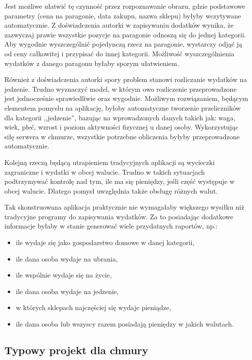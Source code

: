 \documentclass[12pt,a4paper,twoside,titlepage,openright]{book}
\begin{document}
Jest możliwe ułatwić tę czynność przez rozpoznawanie obrazu, gdzie podstawowe parametry (cena na paragonie, data zakupu, nazwa sklepu) byłyby wczytywane automatycznie. Z doświadczenia autorki w zapisywaniu dodatków wynika, że zazwyczaj prawie wszystkie pozycje na paragonie odnoszą się do jednej kategorii. Aby wygodnie wyszczególnić pojedynczą rzecz na paragonie, wystarczy odjąć ją od ceny całkowitej i przypisać do innej kategorii. Możliwość wyszczególnienia wydatków z danego paragonu byłaby sporym ułatwieniem.

Również z doświadczenia autorki spory problem stanowi rozliczanie wydatków na jedzenie. Trudno wyznaczyć model, w którym owo rozliczenie przeprowadzone jest jednocześnie sprawiedliwie oraz wygodnie. Możliwym rozwiązaniem, będącym elementem pomysłu na aplikację, byłoby automatyczne tworzenie przeliczników dla kategorii ,,jedzenie'', bazując na wprowadzonych danych takich jak: waga, wiek, płeć, wzrost i poziom aktywności fizycznej u danej osoby. Wykorzystując siłę serwera w chmurze, wszystkie potrzebne obliczenia byłyby przeprowadzone automatycznie.

Kolejną rzeczą będącą utrapieniem tradycyjnych aplikacji są wycieczki zagraniczne i wydatki w obcej walucie. Trudno w takich sytuacjach podtrzymywać kontrolę nad tym, ile ma się pieniędzy, jeśli część występuje w obcej walucie. Dlatego pomysł uwzględnia także obsługę różnych walut.

Tak skonstruowana aplikacja praktycznie nie wymagałaby większego wysiłku niż tradycyjne programy do zapisywania wydatków. Za to posiadając dodatkowe informacje byłaby w stanie generować wiele przydatnych raportów, np.:
\begin{itemize}
\item ile wydaje się jako gospodarstwo domowe w danej kategorii,
\item ile dana osoba wydaje na ubrania,
\item ile wspólnie wydaje się na życie,
\item ile dana osoba wydaje na jedzenie,
\item w których sklepach najczęściej się wydaje pieniądze,
\item ile dana osoba lub wszyscy razem posiadają pieniędzy w jakich walutach.
\end{itemize}

\subsection{Typowy projekt dla chmury}
\end{document}
